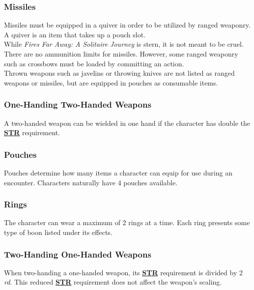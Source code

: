 \documentclass[12pt]{article}
\newcommand{\refto}[1]{\hyperlink{#1}{\textbf{#1}}}
\begin{document}
\begin{multicols*}{2}
\subsubsection{Missiles}
Missiles must be equipped in a quiver in order to be utilized by ranged weaponry. A quiver is an item that takes up a pouch slot.\\
While \emph{Fires Far Away: A Solitaire Journey} is stern, it is not meant to be cruel. There are no ammunition limits for missiles. However, some ranged weaponry such as crossbows must be loaded by committing an action.\\
Thrown weapons such as javelins or throwing knives are not listed as ranged weapons or missiles, but are equipped in pouches as consumable items.

\subsubsection{One-Handing Two-Handed Weapons}
A two-handed weapon can be wielded in one hand if the character has double the \refto{STR} requirement.

\subsubsection{Pouches}
Pouches determine how many items a character can equip for use during an encounter. Characters naturally have 4 pouches available.

\subsubsection{Rings}
The character can wear a maximum of 2 rings at a time. Each ring presents some type of boon listed under its effects.

\subsubsection{Two-Handing One-Handed Weapons}
When two-handing a one-handed weapon, its \refto{STR} requirement is divided by 2 \emph{rd}. This reduced \refto{STR} requirement does not affect the weapon’s scaling.


\end{multicols*}
\end{document}
